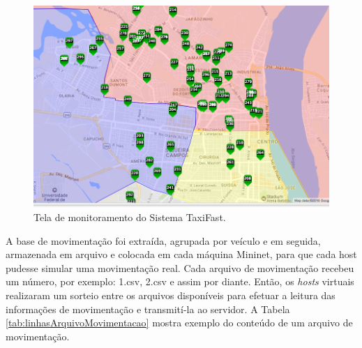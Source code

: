 \documentclass[
	12pt,				%
	oneside,			%
	a4paper,			%
	english,			%
	brazil				%
	]{abntex2ppgsi}
\begin{document}
\begin{figure}[h!]
	\centering
	\includegraphics[width=1.0\columnwidth]{images/taxi_mapa.png}
	\caption{Tela de monitoramento do Sistema TaxiFast.}
	\label{fig:monitoramento}
\end{figure}


A base de movimentação foi extraída, agrupada por veículo e em seguida, armazenada em arquivo e colocada em cada máquina Mininet, para que cada host pudesse simular uma  movimentação real. Cada arquivo de movimentação recebeu um número, por exemplo: 1.csv, 2.csv e assim por diante. Então, os \textit{hosts} virtuais realizaram um sorteio entre os arquivos disponíveis para efetuar a leitura das informações de movimentação e transmití-la ao servidor. A Tabela \ref{tab:linhasArquivoMovimentacao} mostra exemplo do conteúdo de um arquivo de movimentação.
\end{document}
